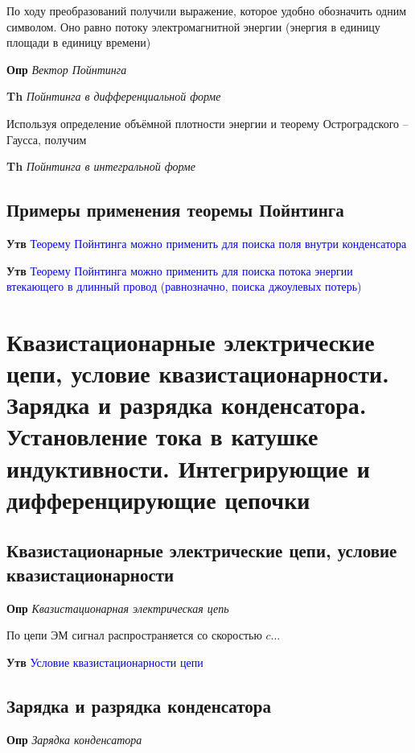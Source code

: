 \documentclass[a4paper, 14pt]{article}
\begin{document}
    По ходу преобразований получили выражение, которое удобно обозначить одним символом.
    Оно равно потоку электромагнитной энергии (энергия в единицу площади в единицу времени)
    
    \textbf{Опр} \textit{Вектор Пойнтинга}
    
    \textbf{Th} \textit{Пойнтинга в дифференциальной форме}
    
    Используя определение объёмной плотности энергии и теорему Остроградского -- Гаусса, получим
    
    \textbf{Th} \textit{Пойнтинга в интегральной форме}
    
    \subsection{Примеры применения теоремы Пойнтинга}
    
    \textbf{Утв} \textcolor{blue}{Теорему Пойнтинга можно применить для поиска поля внутри конденсатора}
    
    \textbf{Утв} \textcolor{blue}{Теорему Пойнтинга можно применить для поиска потока энергии втекающего в
    длинный провод (равнозначно, поиска джоулевых потерь)}
    
    \section{Квазистационарные электрические цепи, условие квазистационарности.
    Зарядка и разрядка конденсатора.
    Установление тока в катушке индуктивности.
    Интегрирующие и дифференцирующие цепочки}
    
    \subsection{Квазистационарные электрические цепи, условие квазистационарности}
    
    \textbf{Опр} \textit{Квазистационарная электрическая цепь}
    
    По цепи ЭМ сигнал распространяется со скоростью $c \ldots$
    
    \textbf{Утв} \textcolor{blue}{Условие квазистационарности цепи}
    
    \subsection{Зарядка и разрядка конденсатора}
    
    \textbf{Опр} \textit{Зарядка конденсатора}
    
\end{document}

